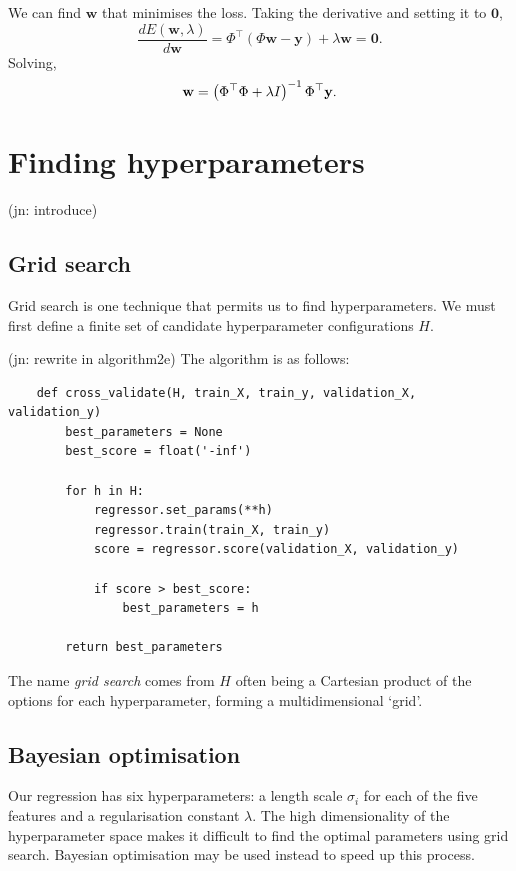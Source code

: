 \documentclass[11pt,twoside,openright]{report}
\newcommand\bw{\mathbf{w}}
\newcommand\by{\mathbf{y}}
\newcommand\jn[1]{{\color{red}(jn: #1)}}
\begin{document}
We can find $\bw$ that minimises the loss. Taking the derivative and setting it to $\mathbf{0}$,\[
    \frac{dE(\bw, \lambda)}{d\bw} = \Phi^\top(\Phi\bw - \by) + \lambda \bw = \mathbf{0} \text{.}
\] Solving,\[
    \bw = \left(\Phi^\top\Phi + \lambda I\right)^{-1}\Phi^\top\by \text.
\]

\section{Finding hyperparameters}

\jn{introduce}

  \subsection{Grid search}

  Grid search is one technique that permits us to find hyperparameters. We must first define a finite set of candidate hyperparameter configurations $H$.

  \jn{rewrite in algorithm2e}
  The algorithm is as follows:
  \begin{verbatim}
    def cross_validate(H, train_X, train_y, validation_X, validation_y)
        best_parameters = None
        best_score = float('-inf')

        for h in H:
            regressor.set_params(**h)
            regressor.train(train_X, train_y)
            score = regressor.score(validation_X, validation_y)

            if score > best_score:
                best_parameters = h

        return best_parameters
  \end{verbatim}

  The name \emph{grid search} comes from $H$ often being a Cartesian product of the options for each hyperparameter, forming a multidimensional `grid'.

  \subsection{Bayesian optimisation}
  Our regression has six hyperparameters: a length scale $\sigma_i$ for each of the five features and a regularisation constant $\lambda$. The high dimensionality of the hyperparameter space makes it difficult to find the optimal parameters using grid search. Bayesian optimisation may be used instead to speed up this process.
\end{document}
